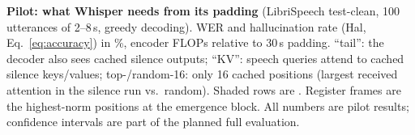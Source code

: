 \begin{table}[!t]
\centering
\caption{\textbf{Pilot: what Whisper needs from its padding} (LibriSpeech test-clean, 100 utterances of 2--8\,s, greedy decoding). WER and hallucination rate (Hal, Eq.~\ref{eq:accuracy}) in \%, encoder FLOPs relative to 30\,s padding. ``tail'': the decoder also sees cached silence outputs; ``KV'': speech queries attend to cached silence keys/values; top-/random-16: only 16 cached positions (largest received attention in the silence run vs.\ random). Shaded rows are \method{}. Register frames are the highest-norm positions at the emergence block. All numbers are pilot results; confidence intervals are part of the planned full evaluation.}
\label{tab:results}

\scriptsize
\setlength{\tabcolsep}{9pt}
\renewcommand{\arraystretch}{0.95}
\setlength{\aboverulesep}{1pt}
\setlength{\belowrulesep}{1pt}
\setlength{\heavyrulewidth}{0.1pt}
\setlength{\lightrulewidth}{0.1pt}


\end{table}

